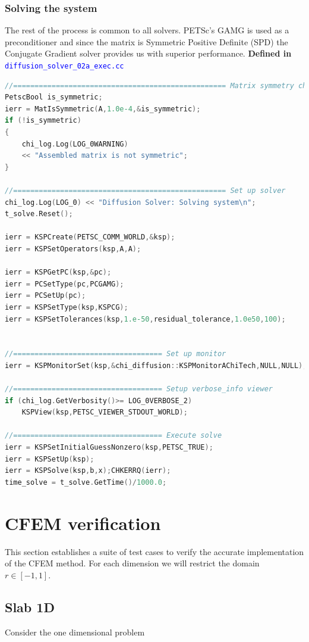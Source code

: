 \documentclass[11pt,letterpaper,titlepage]{article}
\newcommand{\xmltag}[1]{\textcolor{blue}{ \texttt{#1}} }
\numberwithin{equation}{section}
\begin{document}
\subsubsection{Solving the system}
The rest of the process is common to all solvers. PETSc's GAMG is used as a preconditioner and since the matrix is Symmetric Positive Definite (SPD) the Conjugate Gradient solver provides us with superior performance.
\newline
\newline
\textbf{Defined in }\xmltag{diffusion\_solver\_02a\_exec.cc}
\begin{lstlisting}[language=c++]
//================================================== Matrix symmetry check
PetscBool is_symmetric;
ierr = MatIsSymmetric(A,1.0e-4,&is_symmetric);
if (!is_symmetric)
{
	chi_log.Log(LOG_0WARNING)
	<< "Assembled matrix is not symmetric";
}

//================================================== Set up solver
chi_log.Log(LOG_0) << "Diffusion Solver: Solving system\n";
t_solve.Reset();

ierr = KSPCreate(PETSC_COMM_WORLD,&ksp);
ierr = KSPSetOperators(ksp,A,A);

ierr = KSPGetPC(ksp,&pc);
ierr = PCSetType(pc,PCGAMG);
ierr = PCSetUp(pc);
ierr = KSPSetType(ksp,KSPCG);
ierr = KSPSetTolerances(ksp,1.e-50,residual_tolerance,1.0e50,100);


//=================================== Set up monitor
ierr = KSPMonitorSet(ksp,&chi_diffusion::KSPMonitorAChiTech,NULL,NULL);

//=================================== Setup verbose_info viewer
if (chi_log.GetVerbosity()>= LOG_0VERBOSE_2)
	KSPView(ksp,PETSC_VIEWER_STDOUT_WORLD);

//=================================== Execute solve
ierr = KSPSetInitialGuessNonzero(ksp,PETSC_TRUE);
ierr = KSPSetUp(ksp);
ierr = KSPSolve(ksp,b,x);CHKERRQ(ierr);
time_solve = t_solve.GetTime()/1000.0;
\end{lstlisting}


\section{CFEM verification}
This section establishes a suite of test cases to verify the accurate implementation of the CFEM method. For each dimension we will restrict the domain $r \in [-1,1]$.

\subsection{Slab 1D}
Consider the one dimensional problem
\end{document}
